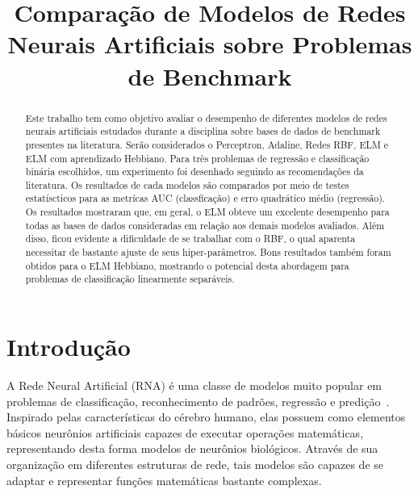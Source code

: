 \documentclass[conference]{IEEEtran}
\begin{document}
	
	\title{Comparação de Modelos de Redes Neurais Artificiais sobre Problemas de Benchmark}
	
	
	\author{
		}
	
	
	
	\maketitle
	
	\begin{abstract}
		Este trabalho tem como objetivo avaliar o desempenho de diferentes modelos de redes neurais artificiais estudados durante a disciplina sobre bases de dados de benchmark presentes na literatura. Serão considerados o Perceptron, Adaline, Redes RBF, ELM e ELM com aprendizado Hebbiano. Para três problemas de regressão e classificação binária escolhidos, um experimento foi desenhado seguindo as recomendações da literatura. Os resultados de cada modelos são comparados por meio de testes estatíscticos para as metrícas AUC (classficação) e erro quadrático médio (regressão). Os resultados mostraram que, em geral, o ELM obteve um excelente desempenho para todas as bases de dados consideradas em relação aos demais modelos avaliados. Além disso, ficou evidente a dificuldade de se trabalhar com o RBF, o qual aparenta necessitar de bastante ajuste de seus hiper-parâmetros. Bons resultados também foram obtidos para o ELM Hebbiano, mostrando o potencial desta abordagem para problemas de classificação linearmente separáveis.
	\end{abstract}

	\section{Introdução}
	A Rede Neural Artificial (RNA) é uma classe de modelos muito popular em problemas de classificação, reconhecimento de padrões, regressão e predição~\cite{jain1996artificial}. Inspirado pelas características do cérebro humano, elas possuem como elementos básicos neurônios artificiais capazes de executar operações matemáticas, representando desta forma modelos de neurônios biológicos. Através de sua organização em diferentes estruturas de rede, tais modelos são capazes de se adaptar e representar funções matemáticas bastante complexas. 
	
\end{document}
